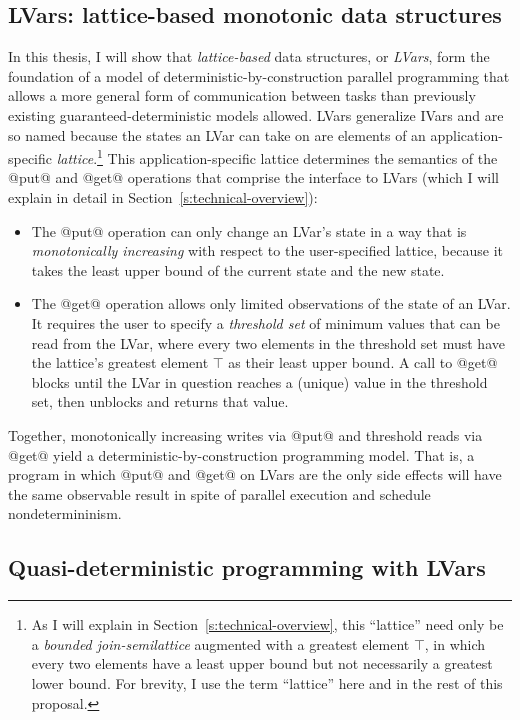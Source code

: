 \documentclass{article}
\begin{document}
\subsection{LVars: lattice-based monotonic data structures}

In this thesis, I will show that \emph{lattice-based} data structures,
or \emph{LVars}, form the foundation of a model of
deterministic-by-construction parallel programming that allows a more
general form of communication between tasks than previously existing
guaranteed-deterministic models allowed.  LVars generalize IVars and
are so named because the states an LVar can take on are elements of an
application-specific \emph{lattice}.\footnote{As I will explain in
  Section~\ref{s:technical-overview}, this ``lattice'' need only be a
  {\em bounded join-semilattice} augmented with a greatest element
  $\top$, in which every two elements have a least upper bound but not
  necessarily a greatest lower bound.  For brevity, I use the term
  ``lattice'' here and in the rest of this proposal.}  This
application-specific lattice determines the semantics of the @put@ and
@get@ operations that comprise the interface to LVars (which I will
explain in detail in Section~\ref{s:technical-overview}):
\begin{itemize}
\item The @put@ operation can only change an LVar's state in a way
  that is {\em monotonically increasing} with respect to the
  user-specified lattice, because it takes the least upper bound of
  the current state and the new state.
\item The @get@ operation allows only limited observations of the
  state of an LVar.  It requires the user to specify a \emph{threshold
    set} of minimum values that can be read from the LVar, where every
  two elements in the threshold set must have the lattice's greatest
  element $\top$ as their least upper bound.  A call to @get@ blocks
  until the LVar in question reaches a (unique) value in the threshold
  set, then unblocks and returns that value.
\end{itemize}
Together, monotonically increasing writes via @put@ and threshold
reads via @get@ yield a deterministic-by-construction programming
model.  That is, a program in which @put@ and @get@ on LVars are the
only side effects will have the same observable result in spite of
parallel execution and schedule nondetermininism.

\subsection{Quasi-deterministic programming with LVars}
\end{document}
